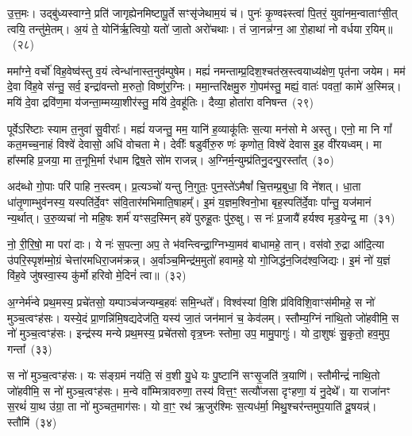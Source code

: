 उ॒त्त॒मः। उद्बु॑ध्यस्वाग्ने॒ प्रति॑ जागृह्येनमिष्टापू॒र्ते सꣳसृ॑जेथाम॒यं च॑। पुनः॑ कृ॒ण्वꣴस्त्वा॑ पि॒तरं॒ युवा॑नम॒न्वाताꣳ॑सी॒त् त्वयि॒ तन्तु॑मे॒तम्। अ॒यं ते॒ योनि॑र्\mbox{}ऋ॒त्वियो॒ यतो॑ जा॒तो अरो॑चथाः। तं जा॒नन्न॑ग्न॒ आ रो॒हाथा॑ नो वर्धया र॒यिम्॥~(२८)

{\anuvakamend[{ध्रु॒वः स॒त्रं कृ॑णुते॒ यः स॒प्तत्रिꣳ॑शच्च}]}%

ममा᳚ग्ने॒ वर्चो॑ विह॒वेष्व॑स्तु व॒यं त्वेन्धा॑नास्त॒नुव॑म्पुषेम। मह्यं॑ नमन्ताम्प्र॒दिश॒श्चत॑स्र॒स्त्वयाध्य॑क्षेण॒ पृत॑ना जयेम। मम॑ दे॒वा वि॑ह॒वे स॑न्तु॒ सर्व॒ इन्द्रा॑वन्तो म॒रुतो॒ विष्णु॑र॒ग्निः। ममा॒न्तरि॑क्षमु॒रु गो॒पम॑स्तु॒ मह्यं॒ वातः॑ पवतां॒ कामे॑ अ॒स्मिन्न्। मयि॑ दे॒वा द्रवि॑ण॒मा य॑जन्ता॒म्मय्या॒शीर॑स्तु॒ मयि॑ दे॒वहू॑तिः। दैव्या॒ होता॑रा वनिषन्त~(२९)

पूर्वे\-ऽरि॑ष्टाः स्याम त॒नुवा॑ सु॒वीराः᳚। मह्यं॑ यजन्तु॒ मम॒ यानि॑ ह॒व्याकू॑तिः स॒त्या मन॑सो मे अस्तु। एनो॒ मा नि गां᳚ कत॒मच्च॒नाहं विश्वे॑ देवासो॒ अधि॑ वोचता मे। देवीः᳚ षडुर्वीरु॒रु णः॑ कृणोत॒ विश्वे॑ देवास इ॒ह वी॑रयध्वम्। मा हा᳚स्महि प्र॒जया॒ मा त॒नूभि॒र्मा र॑धाम द्विष॒ते सो॑म राजन्न्। अ॒ग्निर्म॒न्युम्प्र॑तिनु॒दन्पु॒रस्ता᳚त्~(३०)

अद॑ब्धो गो॒पाः परि॑ पाहि न॒स्त्वम्। प्र॒त्यञ्चो॑ यन्तु नि॒गुतः॒ पुन॒स्ते॑\-ऽमैषां᳚ चि॒त्तम्प्र॒बुधा॒ वि ने॑शत्। धा॒ता धा॑तृ॒णाम्भुव॑नस्य॒ यस्पति॑र्दे॒वꣳ स॑वि॒तार॑मभिमाति॒षाहम्᳚। इ॒मं य॒ज्ञम॒श्विनो॒भा बृह॒स्पति॑र्दे॒वाः पा᳚न्तु॒ यज॑मानं न्य॒र्थात्। उ॒रु॒व्यचा॑ नो महि॒षः शर्म॑ यꣳसद॒स्मिन् हवे॑ पुरुहू॒तः पु॑रु॒क्षु। स नः॑ प्र॒जायै॑ हर्यश्व मृड॒येन्द्र॒ मा~(३१)

नो॒ री॒रि॒षो॒ मा परा॑ दाः। ये नः॑ स॒पत्ना॒ अप॒ ते भ॑वन्त्विन्द्रा॒ग्निभ्या॒मव॑ बाधामहे॒ तान्। वस॑वो रु॒द्रा आ॑दि॒त्या उ॑परि॒स्पृश॑म्मो॒ग्रं चेत्ता॑रमधिरा॒जम॑क्रन्न्। अ॒र्वाञ्च॒मिन्द्र॑म॒मुतो॑ हवामहे॒ यो गो॒जिद्ध॑न॒जिद॑श्व॒जिद्यः। इ॒मं नो॑ य॒ज्ञं वि॑ह॒वे जु॑षस्वा॒स्य कु॑र्मो हरिवो मे॒दिनं॑ त्वा॥~(३२)

{\anuvakamend[{व॒नि॒ष॒न्त॒ पु॒रस्ता॒न्मा त्रिच॑त्वारिꣳशच्च}]}%

अ॒ग्नेर्म॑न्वे प्रथ॒मस्य॒ प्रचे॑तसो॒ यम्पाञ्च॑जन्यम्ब॒हवः॑ समि॒न्धते᳚। विश्व॑स्यां वि॒शि प्र॑विविशि॒वाꣳस॑मीमहे॒ स नो॑ मुञ्च॒त्वꣳह॑सः। यस्ये॒दं प्रा॒णन्नि॑मि॒षद्यदेज॑ति॒ यस्य॑ जा॒तं जन॑मानं च॒ केव॑लम्। स्तौम्य॒ग्निं ना॑थि॒तो जो॑हवीमि॒ स नो॑ मुञ्च॒त्वꣳह॑सः। इन्द्र॑स्य मन्ये प्रथ॒मस्य॒ प्रचे॑तसो वृत्र॒घ्नः स्तोमा॒ उप॒ मामु॒पागुः॑। यो दा॒शुषः॑ सु॒कृतो॒ हव॒मुप॒ गन्ता᳚~(३३)

स नो॑ मुञ्च॒त्वꣳह॑सः। यः स॑ङ्ग्रमं नय॑ति॒ सं व॒शी यु॒धे यः पु॒ष्टानि॑ सꣳसृ॒जति॑ त्र॒याणि॑। स्तौमीन्द्रं॑ नाथि॒तो जो॑हवीमि॒ स नो॑ मुञ्च॒त्वꣳह॑सः। म॒न्वे वा᳚म्मित्रावरुणा॒ तस्य॑ वित्त॒ꣳ॒ सत्यौ॑जसा दृꣳहणा॒ यं नु॒देथे᳚। या राजा॑नꣳ स॒रथं॑ या॒थ उ॑ग्रा॒ ता नो॑ मुञ्चत॒माग॑सः। यो वा॒ꣳ॒ रथ॑ ऋ॒जुर॑श्मिः स॒त्यध॑र्मा॒ मिथु॒श्चर॑न्तमुप॒याति॑ दू॒षयन्न्॑। स्तौमि॑~(३४)

